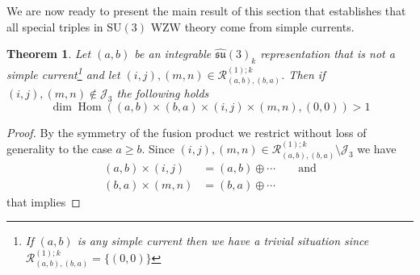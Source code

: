 \documentclass[a4paper,11pt]{article}
\theoremstyle{plain}
\newtheorem{thm}{Theorem}[section]
\theoremstyle{definition}
\newcommand{\mycomment}[1]{}
\newcommand{\aff}{\widehat{\mathfrak{su}}(3)_k}
\begin{document}
We are now ready to present the main result of this section that establishes that all special triples in $\mathrm{SU(3)}$ WZW theory come from simple currents. 
\begin{thm}\label{thmsu3}
    Let $(a,b)$ be an integrable $\aff$ representation that is not a simple current\footnote{If $(a,b)$ is any simple current then we have a trivial situation since $\mathcal{R}^{(1);k}_{(a,b),(b,a)}=\{(0,0)\}$}  and let $(i,j),(m,n)\in \mathcal{R}^{(1);k}_{(a,b),(b,a)}$. Then if $(i,j),(m,n)\notin \mathcal{J}_3$ the following holds
    \begin{equation}
        \operatorname{dim}\operatorname{Hom}\left((a,b)\times (b,a)\times (i,j)\times (m,n),(0,0)\right) > 1
    \end{equation}
\end{thm}
\begin{proof}
\mycomment{    We know from the discussion in the previous section that $(i,j),(m,n)\notin \{(k,0),(0,k)\}$ is always satisfied for $a\neq b$ since then there are no non-trivial simple currents in $\mathcal{R}^{(1);k}_{(a,b),(b,a)}$. Hence, it is  only relevant if $a=b$ and in any case can be rewritten as
    \begin{equation}\label{ijsets}
        (i,j),(m,n)\in \mathcal{R}^{(1);k}_{(a,b),(b,a)}\setminus\mathcal{J}
    \end{equation}
}
\mycomment{
\begin{equation}\label{ijsets}
     (i,j),(m,n)\in
    \left\{\begin{array}{lr}
       \mathcal{R}^{(1);k}_{(a,a),(a,a)}\setminus\left(D_2^{\text{high}}\cup \overline{D}_2^{\text{high}}\cup\{(0,0)\}\right), & \text{if } a=b\\
        \mathcal{R}^{(1);k}_{(a,b),(b,a)}\setminus\{(0,0)\}, & \text{if } a\neq b
        \end{array}\right. \,.
\end{equation}
}
By the symmetry of the fusion product we restrict without loss of generality to the case $a\geq b$. Since $(i,j),(m,n)\in \mathcal{R}^{(1);k}_{(a,b),(b,a)}\setminus\mathcal{J}_3$ we have
\begin{align}
    (a,b)\times (i,j) &= (a,b) \oplus\cdots \qquad \text{and} \nonumber \\
    (b,a)\times (m,n) &=(b,a)\oplus \cdots
\end{align}
that implies 

\end{proof}
\end{document}
